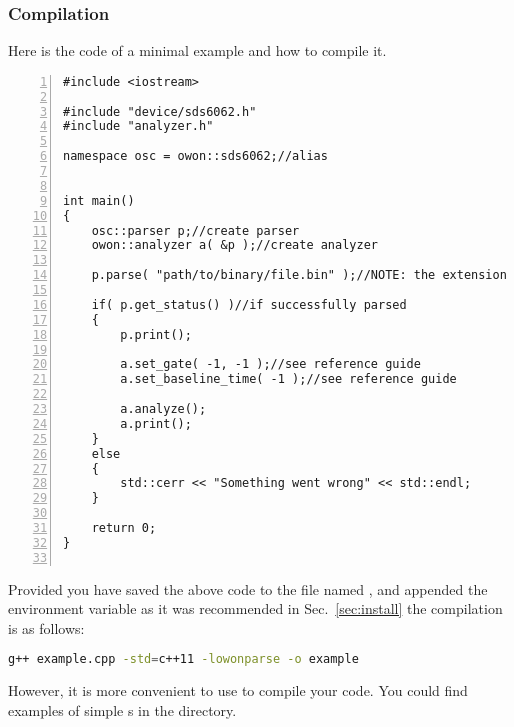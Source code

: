 \subsubsection{Compilation}
Here is the code of a minimal example and how to compile it.
\begin{lstlisting}[numbers=left]
#include <iostream>

#include "device/sds6062.h"
#include "analyzer.h"

namespace osc = owon::sds6062;//alias


int main()
{
    osc::parser p;//create parser
    owon::analyzer a( &p );//create analyzer
    
    p.parse( "path/to/binary/file.bin" );//NOTE: the extension is present
    
    if( p.get_status() )//if successfully parsed
    {
        p.print();
    
        a.set_gate( -1, -1 );//see reference guide
        a.set_baseline_time( -1 );//see reference guide
    
        a.analyze();
        a.print();
    }
    else
    {
        std::cerr << "Something went wrong" << std::endl;
    }
    
    return 0;
}
    
\end{lstlisting}
Provided you have saved the above code to the file named , and
appended the  environment variable as it was
recommended in Sec.~\ref{sec:install} the compilation is as follows:
\begin{lstlisting}[language=bash]
g++ example.cpp -std=c++11 -lowonparse -o example
\end{lstlisting}
However, it is more convenient to use  to compile your code.
You could find examples of simple s in the
 directory.

